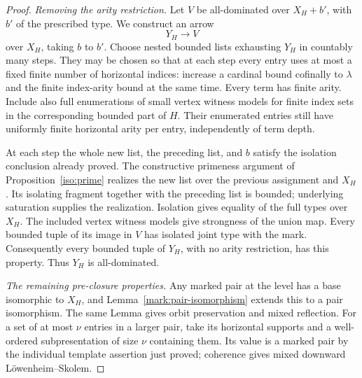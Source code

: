 \begin{proof}
\par\medskip\noindent\textit{Removing the arity restriction.}\quad
Let \(V\) be all-dominated over \(X_H+b'\), with \(b'\)
of the prescribed type.  We construct an arrow
\[
                       Y_H\longrightarrow V
\]
over \(X_H\), taking \(b\) to \(b'\).
Choose nested bounded lists exhausting \(Y_H\) in countably
many steps.  They may be chosen so that at each step every
entry uses at most a fixed finite number of horizontal indices:
increase a cardinal bound cofinally to \(\lambda\) and the
finite index-arity bound at the same time.  Every term has
finite arity.  Include also full enumerations of small
vertex witness models for finite index sets in the
corresponding bounded part of \(H\).  Their enumerated
entries still have uniformly finite horizontal arity per
entry, independently of term depth.

At each step the whole new list, the preceding list, and
\(b\) satisfy the isolation conclusion already proved.
The constructive primeness argument of
Proposition~\ref{iso:prime} realizes the new list over the
previous assignment and \(X_H\).  Its isolating fragment
together with the preceding list is bounded; underlying
saturation supplies the realization.  Isolation gives
equality of the full types over \(X_H\).  The included
vertex witness models give strongness of the union map.
Every bounded tuple of its image in \(V\) has isolated
joint type with the mark.  Consequently every bounded
tuple of \(Y_H\), with no arity restriction, has this
property.  Thus \(Y_H\) is all-dominated.

\par\medskip\noindent\textit{The remaining pre-closure properties.}\quad
Any marked pair at the level has a base isomorphic to
\(X_H\), and Lemma~\ref{mark:pair-isomorphism} extends this
to a pair isomorphism.  The same Lemma gives orbit
preservation and mixed reflection.  For a set of at most
\(\nu\) entries in a larger pair, take its horizontal
supports and a well-ordered subpresentation of size
\(\nu\) containing them.  Its value is a marked pair by
the individual template assertion just proved; coherence
gives mixed downward Löwenheim--Skolem.


\end{proof}
